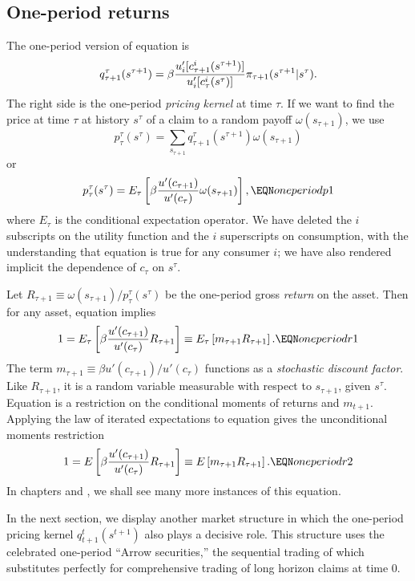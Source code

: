 \subsection{One-period returns}
The one-period version of equation  is
$$q^\tau_{\tau+1}(s^{\tau +1}) = \beta {u'_i[c_{\tau+1}^i(s^{\tau+1})]
               \over u'_i[c_\tau^i(s^\tau)] } \pi_{\tau+1}(s^{\tau+1} \vert s^\tau). $$
The right side is the one-period {\it pricing kernel} at time $\tau$.
If we want to  find the  price  at time $\tau$ at history $s^\tau$
of a claim to a random payoff $\omega(s_{\tau+1})$, we use
$$ p^\tau_{\tau}(s^\tau) = \sum_{s_{\tau+1}} q^\tau_{\tau+1}(s^{\tau+1})
      \omega(s_{\tau+1}) $$
or
$$ p^\tau_{\tau}(s^\tau) = E_\tau \left[\beta {u'(c_{\tau+1}) \over u'(c_{\tau})}
       \omega(s_{\tau +1}) \right], \EQN oneperiodp1 $$
where $E_\tau$ is the conditional expectation operator.
We have deleted the $i$ subscripts on the utility function
and the $i$ superscripts on consumption, with the
understanding that equation  is true for any consumer $i$;
we have also rendered implicit the  dependence of $c_{\tau}$ on $s^\tau$.


Let $R_{\tau+1} \equiv \omega(s_{\tau+1}) /p^\tau_{\tau}(s^\tau) $
 be the one-period gross {\it return} on the asset.
Then for any asset, equation  implies
$$ 1 = E_\tau \left[\beta{u'(c_{\tau+1}) \over u'(c_\tau)} R_{\tau+1} \right]
     \equiv E_\tau \left[ m_{\tau+1} R_{\tau+1} \right]  .
    \EQN oneperiodr1 $$
The term $m_{\tau+1} \equiv \beta u'(c_{\tau+1}) / u'(c_\tau)$
functions as a {\it stochastic discount factor}.    Like
$R_{\tau+1}$, it is a random %
variable  measurable with respect to $s_{\tau+1}$, given
$s^{\tau}$.
    Equation  is a restriction on
the conditional moments of returns and $m_{t+1}$.  Applying
the law of iterated expectations to equation  gives
the unconditional moments restriction
$$ 1 = E \left[\beta{u'(c_{\tau+1}) \over u'(c_\tau)} R_{\tau+1} \right]
     \equiv E \left[ m_{\tau+1} R_{\tau+1} \right]  .
    \EQN oneperiodr2 $$
In chapters  and , we shall see many more instances of this
equation.


In the next section, we display  another market structure in which
  the one-period pricing kernel $q^t_{t+1}(s^{t+1})$    also plays
a decisive role.  This structure uses the
celebrated one-period ``Arrow  securities,'' the sequential
trading of which  substitutes perfectly for  comprehensive trading
of long horizon claims at  time $0$.

